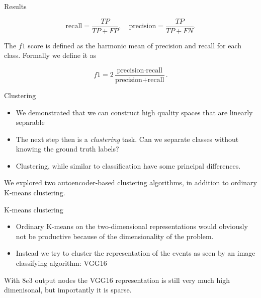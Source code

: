 \documentclass{beamer}
\begin{document}
\begin{frame}[t]{Results}
	\begin{figure}[h]
	\end{figure}
	\begin{equation}\label{eq:recall}
		\text{recall}= \frac{TP}{TP + FP}, \quad
		\text{precision} = \frac{TP}{TP + FN}.
	\end{equation}

	\noindent The $f1$ score is defined as the harmonic mean of precision and recall for each class. Formally we define it as

	\begin{equation}\label{eq:f1}
		f1 = 2 \frac{\text{precision} \cdot \text{recall}}{\text{precision} + \text{recall}}.
	\end{equation}
\end{frame}
\begin{frame}[t]{Clustering}
	\begin{itemize}
		\item We demonstrated that we can construct high quality spaces that are linearly separable
		\item The next step then is a \textit{clustering} task. Can we separate classes without knowing the ground truth labels? 
		\item Clustering, while similar to classification have some principal differences.
	\end{itemize}
	We explored two autoencoder-based clustering algorithms, in addition to ordinary K-means clustering.
\end{frame}

\begin{frame}[t]{K-means clustering}
	\begin{itemize}
		\item Ordinary K-means on the two-dimensional representations would obviously not be productive because of the dimensionality of the problem.
		\item Instead we try to cluster the representation of the events as seen by an image classifying algorithm: VGG16
	\end{itemize}

	With $8e3$ output nodes the VGG16 representation is still very much high dimenisonal, but importantly it is sparse.
\end{frame}
\end{document}
